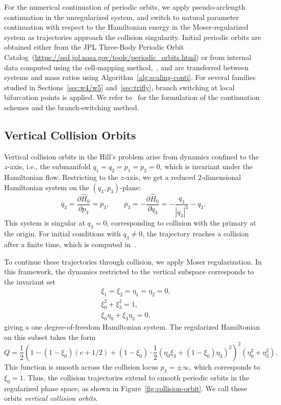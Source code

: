 \documentclass[pdflatex,sn-mathphys-ay]{sn-jnl}%
\theoremstyle{thmstyleone}%
\theoremstyle{thmstyletwo}%
\theoremstyle{thmstylethree}%
\begin{document}
For the numerical continuation of periodic orbits, we apply pseudo-arclength continuation in the unregularized system, and switch to natural parameter continuation with respect to the Hamiltonian energy in the Moser-regularized system as trajectories approach the collision singularity. 
Initial periodic orbits are obtained either from the JPL Three-Body Periodic Orbit Catalog~(\url{https://ssd.jpl.nasa.gov/tools/periodic_orbits.html}) or from internal data computed using the cell-mapping method,~\cite{koh_cell_mapping_2021}, and are transferred between systems and mass ratios using Algorithm~\ref{alg:scaling-conti}. 
For several families studied in Sections~\ref{sec:w4/w5} and~\ref{sec:trifly}, branch switching at local bifurcation points is applied. 
We refer to~\cite[Section~10.2]{kuznetsov_applied_bifurcation_theory_2023} for the formulation of the continuation schemes and the branch-switching method.

\subsection{Vertical Collision Orbits}
\label{sec:vertical-collision}
Vertical collision orbits in the Hill's problem arise from dynamics confined to the $z$-axis, i.e., the submanifold $q_1 = q_2 = p_1 = p_2 = 0$, which is invariant under the Hamiltonian flow.
Restricting to the $z$-axis, we get a reduced $2$-dimensional Hamiltonian system on the $(q_3, p_3)$-plane:
\[
    \dot{q_3} = \frac{\partial \hat{H}_0}{\partial p_3} = p_3,
    \qquad
    \dot{p_3} = -\frac{\partial \hat{H}_0}{\partial q_3} = - \frac{q_3}{|q_3|^3} - q_3.  
\]
This system is singular at $q_3=0$, corresponding to collision with the primary at the origin. For initial conditions with $q_3\neq 0$, the trajectory reaches a collision after a finite time, which is computed in~\cite{belbruno_family_2019}.

To continue these trajectories through collision, we apply Moser regularization. In this framework, the dynamics restricted to the vertical subspace corresponds to the invariant set
\begin{align*}
& \xi_1 = \xi_2 = \eta_1 = \eta_2 = 0, \\
& \xi_0^2 + \xi_3 ^2 = 1, \\
& \xi_0\eta_0 + \xi_3\eta_3 = 0,
\end{align*}
giving a one degree-of-freedom Hamiltonian system. 
The regularized Hamiltonian on this subset takes the form
\begin{equation*}
Q = \frac{1}{2}\left(
    1 - (1 - \xi_0)(c + 1/2) + (1 - \xi_0)\cdot \frac{1}{2}(\eta_0\xi_3 + (1 - \xi_0)\eta_3)^2
\right)^2(\eta_0^2 + \eta_3^2).
\end{equation*}
This function is smooth across the collision locus $p_3=\pm \infty$, which corresponds to $\xi_0 = 1$. Thus, the collision trajectories extend to smooth periodic orbits in the regularized phase space, as shown in Figure~\ref{fig:collision-orbit}. We call these orbits \emph{vertical collision orbits}.
\end{document}
